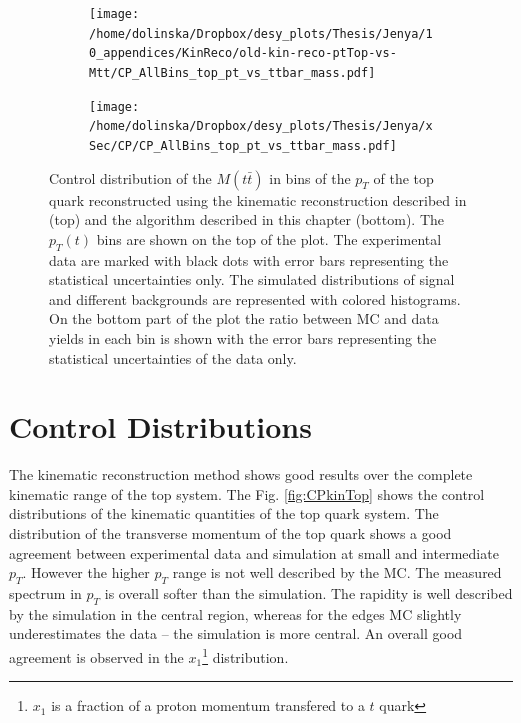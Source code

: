 \begin{figure}[t]
\centering
\begin{subfigure}
  \centering
  \texttt{[image: /home/dolinska/Dropbox/desy\_plots/Thesis/Jenya/10\_appendices/KinReco/old-kin-reco-ptTop-vs-Mtt/CP\_AllBins\_top\_pt\_vs\_ttbar\_mass.pdf]}
\end{subfigure}
\begin{subfigure}
  \centering
  \texttt{[image: /home/dolinska/Dropbox/desy\_plots/Thesis/Jenya/xSec/CP/CP\_AllBins\_top\_pt\_vs\_ttbar\_mass.pdf]}
\end{subfigure}
\caption{Control distribution of the $M(t\bar{t})$ in bins of the $p_{T}$ of the top quark reconstructed using the kinematic reconstruction described in
         \cite{Chatrchyan:2012saa} (top) and the algorithm described in this chapter (bottom). The $p_{T}(t)$ bins are shown on the top of the plot.
         The experimental data are marked with black dots with error bars representing the statistical uncertainties only. The simulated 
         distributions of signal and different backgrounds are represented with colored histograms. On the bottom part of the plot the ratio between 
         MC and data yields in each bin is shown with the error bars representing the statistical uncertainties of the data only.}
\label{fig:old_vs_new}
\end{figure}


\section{Control Distributions}

The kinematic reconstruction method shows good results over the complete kinematic range of the top system. The Fig. \ref{fig:CPkinTop} shows
the control distributions of the kinematic quantities of the top quark system. The distribution of the transverse momentum of the top quark
shows a good agreement between experimental data and simulation at small and intermediate $p_{T}$. However the higher $p_{T}$ range is not well
described by the MC. The measured spectrum in $p_{T}$ is overall softer than the simulation. The rapidity is well described by the simulation in the central region, 
whereas for the edges MC slightly underestimates the data -- the simulation is more central.
An overall good agreement is observed in the  $x_{1}$\footnote{ $x_{1}$ is a fraction of a proton momentum transfered to a $t$ quark} 
distribution.

